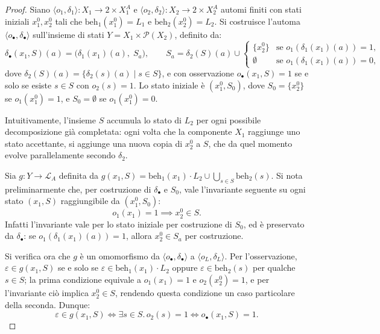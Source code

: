 \begin{proof}
  Siano \(\langle o_1, \delta_1 \rangle : X_1 \to 2 \times X_1^A\) e \(\langle o_2, \delta_2 \rangle : X_2 \to 2 \times X_2^A\) automi finiti con stati iniziali \(x_1^0, x_2^0\) tali che \(\mathrm{beh}_1(x_1^0) = L_1\) e \(\mathrm{beh}_2(x_2^0) = L_2\). Si costruisce l'automa \(\langle o_\bullet, \delta_\bullet \rangle\) sull'insieme di stati \(Y = X_1 \times \mathcal{P}(X_2)\), definito da:
  \[
    \delta_\bullet(x_1, S)(a) = \bigl(\delta_1(x_1)(a),\; S_a\bigr), \qquad S_a = \delta_2(S)(a) \cup \begin{cases} \{x_2^0\} & \text{se } o_1(\delta_1(x_1)(a)) = 1, \\ \emptyset & \text{se } o_1(\delta_1(x_1)(a)) = 0, \end{cases}
  \]
  dove \(\delta_2(S)(a) = \{\delta_2(s)(a) \mid s \in S\}\), e con osservazione \(o_\bullet(x_1, S) = 1\) se e solo se esiste \(s \in S\) con \(o_2(s) = 1\). Lo stato iniziale è \((x_1^0, S_0)\), dove \(S_0 = \{x_2^0\}\) se \(o_1(x_1^0) = 1\), e \(S_0 = \emptyset\) se \(o_1(x_1^0) = 0\).

  Intuitivamente, l'insieme \(S\) accumula lo stato di \(L_2\) per ogni possibile decomposizione già completata: ogni volta che la componente \(X_1\) raggiunge uno stato accettante, si aggiunge una nuova copia di \(x_2^0\) a \(S\), che da quel momento evolve parallelamente secondo \(\delta_2\).

  Sia \(g : Y \to \mathcal{L}_A\) definita da \(g(x_1, S) = \mathrm{beh}_1(x_1) \cdot L_2 \cup \bigcup_{s \in S} \mathrm{beh}_2(s)\). Si nota preliminarmente che, per costruzione di \(\delta_\bullet\) e \(S_0\), vale l'invariante seguente su ogni stato \((x_1, S)\) raggiungibile da \((x_1^0, S_0)\):
  \[
    o_1(x_1) = 1 \implies x_2^0 \in S.
  \]
  Infatti l'invariante vale per lo stato iniziale per costruzione di \(S_0\), ed è preservato da \(\delta_\bullet\): se \(o_1(\delta_1(x_1)(a)) = 1\), allora \(x_2^0 \in S_a\) per costruzione.

  Si verifica ora che \(g\) è un omomorfismo da \(\langle o_\bullet, \delta_\bullet \rangle\) a \(\langle o_L, \delta_L \rangle\). Per l'osservazione, \(\varepsilon \in g(x_1, S)\) se e solo se \(\varepsilon \in \mathrm{beh}_1(x_1) \cdot L_2\) oppure \(\varepsilon \in \mathrm{beh}_2(s)\) per qualche \(s \in S\); la prima condizione equivale a \(o_1(x_1) = 1\) e \(o_2(x_2^0) = 1\), e per l'invariante ciò implica \(x_2^0 \in S\), rendendo questa condizione un caso particolare della seconda. Dunque:
  \[
    \varepsilon \in g(x_1, S) \iff \exists s \in S.\, o_2(s) = 1 \iff o_\bullet(x_1, S) = 1.
  \]


\end{proof}
